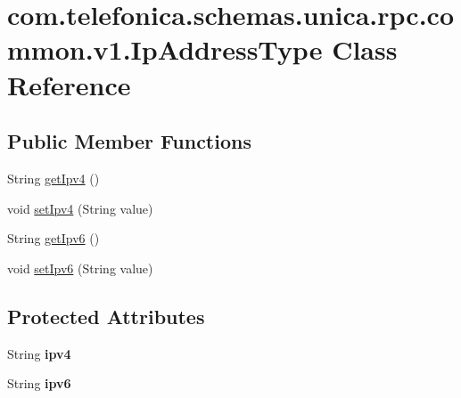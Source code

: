 \hypertarget{classcom_1_1telefonica_1_1schemas_1_1unica_1_1rpc_1_1common_1_1v1_1_1IpAddressType}{
\section{com.telefonica.schemas.unica.rpc.common.v1.IpAddressType Class Reference}
\label{classcom_1_1telefonica_1_1schemas_1_1unica_1_1rpc_1_1common_1_1v1_1_1IpAddressType}
}
\subsection*{Public Member Functions}
\begin{DoxyCompactItemize}
\item 
String \hyperlink{classcom_1_1telefonica_1_1schemas_1_1unica_1_1rpc_1_1common_1_1v1_1_1IpAddressType_ace63f336b2a230079fc5fe2654581090}{getIpv4} ()
\item 
void \hyperlink{classcom_1_1telefonica_1_1schemas_1_1unica_1_1rpc_1_1common_1_1v1_1_1IpAddressType_a77e7184dbd5bb035450dca89fec6843b}{setIpv4} (String value)
\item 
String \hyperlink{classcom_1_1telefonica_1_1schemas_1_1unica_1_1rpc_1_1common_1_1v1_1_1IpAddressType_a7a441f793ad594357e8ab136f855f885}{getIpv6} ()
\item 
void \hyperlink{classcom_1_1telefonica_1_1schemas_1_1unica_1_1rpc_1_1common_1_1v1_1_1IpAddressType_ac78239c9ce0ee92cdbd90bd4aa1de394}{setIpv6} (String value)
\end{DoxyCompactItemize}
\subsection*{Protected Attributes}
\begin{DoxyCompactItemize}
\item 
\hypertarget{classcom_1_1telefonica_1_1schemas_1_1unica_1_1rpc_1_1common_1_1v1_1_1IpAddressType_a6912369b15bc171cb02894adc4844c3a}{
String {\bfseries ipv4}}
\label{classcom_1_1telefonica_1_1schemas_1_1unica_1_1rpc_1_1common_1_1v1_1_1IpAddressType_a6912369b15bc171cb02894adc4844c3a}

\item 
\hypertarget{classcom_1_1telefonica_1_1schemas_1_1unica_1_1rpc_1_1common_1_1v1_1_1IpAddressType_a301cb83723f88e4040cc97e780b879f7}{
String {\bfseries ipv6}}
\label{classcom_1_1telefonica_1_1schemas_1_1unica_1_1rpc_1_1common_1_1v1_1_1IpAddressType_a301cb83723f88e4040cc97e780b879f7}

\end{DoxyCompactItemize}


